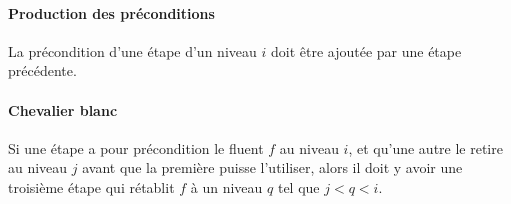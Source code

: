 {%
\paragraph*{Production des préconditions} La précondition d'une étape d'un niveau
  $i$ doit être ajoutée par une étape précédente.

\paragraph*{Chevalier blanc} Si une étape a pour précondition le fluent $f$
  au niveau $i$, et qu'une autre le retire au niveau $j$ avant que la première
  puisse l'utiliser, alors il doit y avoir une troisième étape qui rétablit $f$
  à un niveau $q$ tel que $j < q < i$.


}